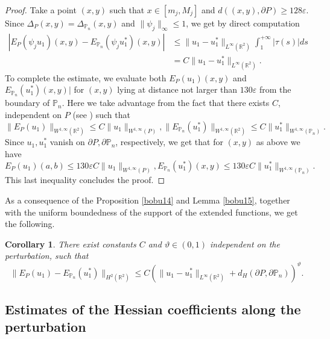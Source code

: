 \documentclass[11pt]{article}
\numberwithin{equation}{section}\newtheorem*{jepEnonce}{\jepEnonceTitle}\newenvironment{enonce*}[1]{\def\jepEnonceTitle{#1}\jepEnonce}{\endjepEnonce}\newtheorem*{conj*}{Conjecture}
\theoremstyle{plain}
\newtheorem{cor}[thm]{Corollary}
\theoremstyle{definition}
\newcommand{\thetathree}{\vartheta}
\let\Bbb\mathbb
\def\R{\mathbb{R}}
\newcommand{\vps}{\varepsilon}
\begin{document}
\begin{proof}
Take a point $(x,y)$ such that $x \in [m_j, M_j]$ and $d((x,y), \partial P) \ge 128 \vps$. Since $\Delta_P(x,y) =\Delta_{\Bbb P_n}(x,y)$ and $\|\psi_j\|_\infty \le 1$, we get by direct computation
\begin{align*}
|E_P(\psi_j u_1)(x,y)-E_{\Bbb P_n}(\psi_j u^*_1)(x,y)|&\le \|u_1-u_1^*\|_{L^\infty(\R^2)}\int_1^{+\infty}|\tau(s) | ds \\
&= C \|u_1-u_1^*\|_{L^\infty(\R^2)}.
\end{align*}
To complete the estimate, we evaluate both $E_P(u_1)(x,y)$ and $E_{\Bbb P_n}(u^*_1)(x,y)|$ for $(x,y)$ lying at distance not larger than $130 \vps$ from the boundary of $\Bbb P_n$. Here we take advantage from the fact that there exists $C$, independent on $P$ (see \cite[Th.\,5, p.\,181]{St70}) such that
\[
\|E_P(u_1)\|_{W^{1, \infty} (\R^2)} \le C \|u_1\|_{W^{1, \infty} (P)}, \|E_ {\Bbb P_n}(u_1^*)\|_{W^{1, \infty} (\R^2)} \le C \|u_1^*\|_{W^{1, \infty} (\Bbb P_n)}.
\]
Since $u_1, u_1^*$ vanish on $\partial P, \partial \mathbb P_n$, respectively, we get that for $(x,y)$ as above we have
\[
E_P(u_1)(a,b) \le 130 \vps C \|u_1\|_{W^{1, \infty} (P)}, E_ {\Bbb P_n}(u_1^*)(x,y) \le 130 \vps C \|u_1^*\|_{W^{1, \infty} (\Bbb P_n)}.
\]
This last inequality concludes the proof.
\end{proof}
As a consequence of the Proposition \ref{bobu14} and Lemma \ref{bobu15}, together with the uniform boundedness of the support of the extended functions, we get the following.
\begin{cor}
There exist constants $C$ and $\thetathree \in (0, 1)$ independent on the perturbation, such that
\[
\|E_P(u_1)-E_{\Bbb P_n}(u_1^*)\|_{H^{2} (\R^2)}\le C (\|u_1-u_1^*\|_{L^\infty(\R^2)}+d_H(\partial P, \partial \Bbb P_n))^\thetathree.
\]
\end{cor}

\subsection{Estimates of the Hessian coefficients along the perturbation}
\end{document}
